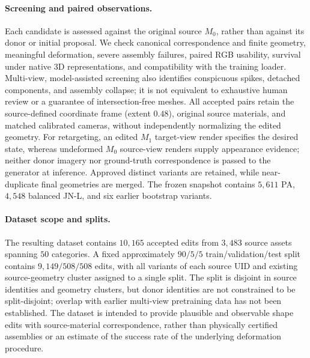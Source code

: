 \begin{appendix}
\paragraph{Screening and paired observations.}
Each candidate is assessed against the original source $M_0$, rather than against its donor or initial proposal.
We check canonical correspondence and finite geometry, meaningful deformation, severe assembly failures, paired RGB usability, survival under native 3D representations, and compatibility with the training loader.
Multi-view, model-assisted screening also identifies conspicuous spikes, detached components, and assembly collapse; it is not equivalent to exhaustive human review or a guarantee of intersection-free meshes.
All accepted pairs retain the source-defined coordinate frame (extent $0.48$), original source materials, and matched calibrated cameras, without independently normalizing the edited geometry.
For retargeting, an edited $M_1$ target-view render specifies the desired state, whereas undeformed $M_0$ source-view renders supply appearance evidence; neither donor imagery nor ground-truth correspondence is passed to the generator at inference.
Approved distinct variants are retained, while near-duplicate final geometries are merged.
The frozen snapshot contains $5{,}611$ PA, $4{,}548$ balanced JN-L, and six earlier bootstrap variants.

\paragraph{Dataset scope and splits.}
The resulting dataset contains $10{,}165$ accepted edits from $3{,}483$ source assets spanning $50$ categories.
A fixed approximately $90/5/5$ train/validation/test split contains $9{,}149/508/508$ edits, with all variants of each source UID and existing source-geometry cluster assigned to a single split.
The split is disjoint in source identities and geometry clusters, but donor identities are not constrained to be split-disjoint; overlap with earlier multi-view pretraining data has not been established.
The dataset is intended to provide plausible and observable shape edits with source-material correspondence, rather than physically certified assemblies or an estimate of the success rate of the underlying deformation procedure.





































\end{appendix}
